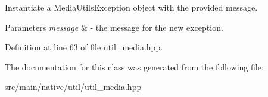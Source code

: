 Instantiate a MediaUtilsException object with the provided message. 


\begin{DoxyParams}{Parameters}
{\em message} & -\/ the message for the new exception. \\
\hline
\end{DoxyParams}


Definition at line 63 of file util\_\-media.hpp.



The documentation for this class was generated from the following file:\begin{DoxyCompactItemize}
\item 
src/main/native/util/util\_\-media.hpp\end{DoxyCompactItemize}
